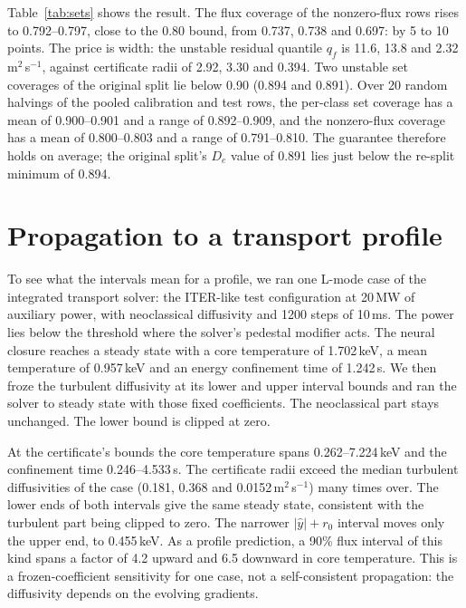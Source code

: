 \documentclass[11pt]{article}
\begin{document}
Table~\ref{tab:sets} shows the result.  The flux coverage of the nonzero-flux
rows rises to 0.792--0.797, close to the 0.80 bound, from 0.737, 0.738 and
0.697: by 5 to 10 points.
The price is width: the unstable residual quantile $q_f$ is 11.6, 13.8 and
2.32\,m$^2$\,s$^{-1}$, against certificate radii of 2.92, 3.30 and 0.394.  Two
unstable set coverages of the original split lie below 0.90 (0.894 and 0.891).
Over 20 random halvings of the pooled calibration and test rows, the
per-class set coverage has a mean of 0.900--0.901 and a range of 0.892--0.909,
and the nonzero-flux coverage has a mean of 0.800--0.803 and a range of
0.791--0.810.  The guarantee therefore holds on average; the original split's
$D_e$ value of 0.891 lies just below the re-split minimum of 0.894.

\section{Propagation to a transport profile}

To see what the intervals mean for a profile, we ran one L-mode case of the
integrated transport solver: the ITER-like test configuration at 20\,MW of
auxiliary power, with neoclassical diffusivity and 1200 steps of 10\,ms.  The
power lies below the threshold where the solver's pedestal modifier acts.  The
neural closure reaches a steady state with a core temperature of 1.702\,keV, a
mean temperature of 0.957\,keV and an energy confinement time of 1.242\,s.
We then froze the turbulent diffusivity at its lower and upper interval bounds
and ran the solver to steady state with those fixed coefficients.  The
neoclassical part stays unchanged.  The lower bound is clipped at zero.

At the certificate's bounds the core temperature spans 0.262--7.224\,keV and
the confinement time 0.246--4.533\,s.  The certificate radii exceed the median
turbulent diffusivities of the case (0.181, 0.368 and 0.0152\,m$^2$\,s$^{-1}$)
many times over.  The lower ends of both intervals give the same steady state,
consistent with the turbulent part being clipped to zero.  The narrower
$|\hat{y}| + r_0$ interval moves only the upper end, to 0.455\,keV.  As a
profile prediction, a 90\% flux interval of this kind spans a factor of 4.2
upward and 6.5 downward in core temperature.  This is a frozen-coefficient sensitivity
for one case, not a self-consistent propagation: the diffusivity depends on the
evolving gradients.
\end{document}
